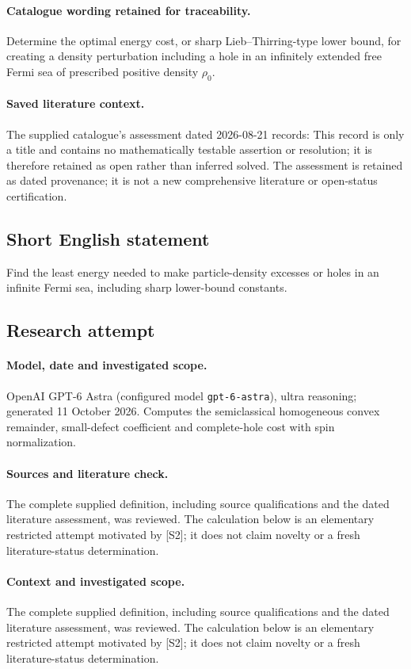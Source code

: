 \documentclass[11pt]{article}
\begin{document}
\paragraph{Catalogue wording retained for traceability.}
Determine the optimal energy cost, or sharp Lieb–Thirring-type lower bound, for creating a density perturbation including a hole in an infinitely extended free Fermi sea of prescribed positive density $\rho_0$.

\paragraph{Saved literature context.} The supplied catalogue's assessment dated 2026-08-21 records: This record is only a title and contains no mathematically testable assertion or resolution; it is therefore retained as open rather than inferred solved. The assessment is retained as dated provenance; it is not a new comprehensive literature or open-status certification.
\subsection{Short English statement}
Find the least energy needed to make particle-density excesses or holes in an infinite Fermi sea, including sharp lower-bound constants.
\subsection{Research attempt}
\paragraph{Model, date and investigated scope.}
OpenAI GPT-6 Astra (configured model \texttt{gpt-6-astra}), ultra reasoning; generated 11 October 2026. Computes the semiclassical homogeneous convex remainder, small-defect coefficient and complete-hole cost with spin normalization.

\paragraph{Sources and literature check.}
The complete supplied definition, including source qualifications and the dated literature assessment, was reviewed. The calculation below is an elementary restricted attempt motivated by [S2]; it does not claim novelty or a fresh literature-status determination.

\paragraph{Context and investigated scope.} The complete supplied definition, including source qualifications and the dated literature assessment, was reviewed. The calculation below is an elementary restricted attempt motivated by [S2]; it does not claim novelty or a fresh literature-status determination.
\end{document}

